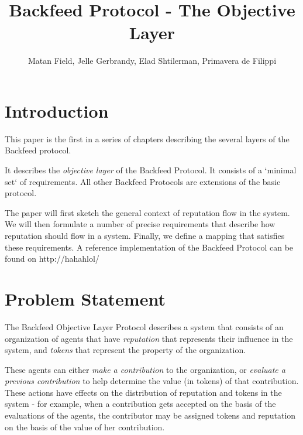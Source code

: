 \documentclass{article}
\begin{document}
\newcommand{\flow}{\Phi}
\newenvironment{condition}[1]
	{
	\begin{center}
	   \begin{tabular}{|p{0.9\textwidth}|}
		\hline\\
		{\bf #1:}\\
	}
	{
		\\ \\\hline
	\end{tabular}
	\end{center}
	}
    
\title{Backfeed Protocol - The Objective Layer}
\author{Matan Field, Jelle Gerbrandy, Elad Shtilerman, Primavera de Filippi}
\date{}
\maketitle

\tableofcontents

\section{Introduction}

This paper is the first in a series of chapters describing the several layers of the Backfeed protocol. 

It describes the {\em objective layer} of the Backfeed Protocol. It consists of a `minimal set` of requirements. All other Backfeed Protocols are extensions of the basic protocol.

The paper will first sketch the general context of reputation flow in the system. 
We will then formulate a number of precise requirements that describe how reputation should flow in a system. Finally, we define a mapping that satisfies these requirements.
A reference implementation of the Backfeed Protocol can be found on http://hahahlol/

\section{Problem Statement}

The Backfeed Objective Layer Protocol describes a system that consists of an organization of agents that have {\em reputation} that represents their influence in the system, and {\em tokens} that represent the property of the organization.

These agents can either {\em make a contribution} to the organization, or {\em evaluate a previous contribution} to help determine the value (in tokens) of that contribution. These actions have effects on the distribution of reputation and tokens in the system - for example, when a contribution gets accepted on the basis of the evaluations of the agents, the contributor may be assigned tokens and reputation on the basis of the value of her contribution.
\end{document}
